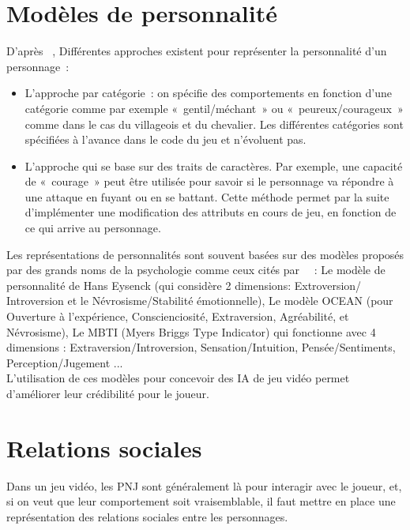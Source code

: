 \documentclass[asi]{picINSAIA}
\begin{document}
\section{Modèles de personnalité}
D'après ~\cite{ochs2009simulation}, Différentes approches existent pour représenter la personnalité d'un personnage :
\begin{itemize}
\item L'approche par catégorie : on spécifie des comportements en fonction d'une catégorie comme par exemple « gentil/méchant » ou « peureux/courageux » comme dans le cas du villageois et du chevalier. Les différentes catégories sont spécifiées à l'avance dans le code du jeu et n'évoluent pas.
\item L'approche qui se base sur des traits de caractères. Par exemple, une capacité de « courage » peut être utilisée pour savoir si le personnage va répondre à une attaque en fuyant ou en se battant. Cette méthode permet par la suite d'implémenter une modification des attributs en cours de jeu, en fonction de ce qui arrive au personnage.  
\end{itemize}
Les représentations de personnalités sont souvent basées sur des modèles proposés par des grands noms de la psychologie comme ceux cités par ~\cite{ochs2009simulation} : Le modèle de personnalité de Hans Eysenck (qui considère 2 dimensions: Extroversion/ Introversion et le Névrosisme/Stabilité émotionnelle), Le modèle OCEAN (pour Ouverture à l'expérience, Conscienciosité, Extraversion, Agréabilité, et Névrosisme), Le MBTI (Myers Briggs Type Indicator) qui fonctionne avec 4 dimensions : Extraversion/Introversion, Sensation/Intuition, Pensée/Sentiments, Perception/Jugement ... \\
L'utilisation de ces modèles pour concevoir des IA de jeu vidéo permet d'améliorer leur crédibilité pour le joueur.

\section{Relations sociales}
Dans un jeu vidéo, les PNJ sont généralement là pour interagir avec le joueur, et, si on veut que leur comportement soit vraisemblable, il faut mettre en place une représentation des relations sociales entre les personnages. \\
\end{document}
